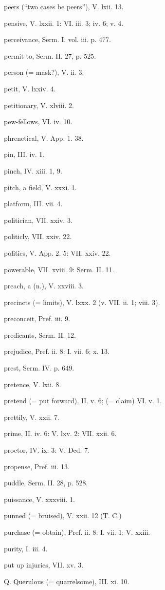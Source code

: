 peers (“two cases be peers”), V. lxii. 13.

pensive, V. lxxii. 1: VI. iii. 3; iv. 6; v. 4.

perceivance, Serm. I. vol. iii. p. 477.

permit to, Serm. II. 27, p. 525.

person (= mask?), V. ii. 3.

petit, V. lxxiv. 4.

petitionary, V. xlviii. 2.

pew-fellows, VI. iv. 10.

phrenetical, V. App. 1. 38.

pin, III. iv. 1.

pinch, IV. xiii. 1, 9.

pitch, a field, V. xxxi. 1.

platform, III. vii. 4.

politician, VII. xxiv. 3.

politicly, VII. xxiv. 22.

politics, V. App. 2. 5: VII. xxiv. 22.

powerable, VII. xviii. 9: Serm. II. 11.

preach, a (n.), V. xxviii. 3.

precincts (= limits), V. lxxx. 2 (v. VII. ii. 1; viii. 3).

preconceit, Pref. iii. 9.

predicants, Serm. II. 12.

prejudice, Pref. ii. 8: I. vii. 6; x. 13.

prest, Serm. IV. p. 649.

pretence, V. lxii. 8.

pretend (= put forward), II. v. 6; (= claim) VI. v. 1.

prettily, V. xxii. 7.

prime, II. iv. 6: V. lxv. 2: VII. xxii. 6.

proctor, IV. ix. 3: V. Ded. 7.

propense, Pref. iii. 13.

puddle, Serm. II. 28, p. 528.

puissance, V. xxxviii. 1.

punned (= bruised), V. xxii. 12 (T. C.)

purchase (= obtain), Pref. ii. 8: I. vii. 1: V. xxiii.

purity, I. iii. 4.

put up injuries, VII. xv. 3.

Q.
Querulous (= quarrelsome), III. xi. 10.

